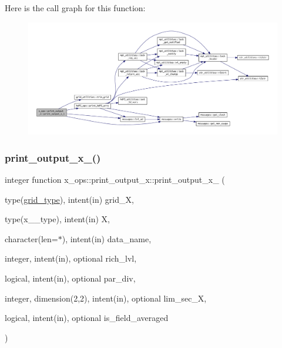 Here is the call graph for this function\+:\nopagebreak
\begin{figure}[H]
\begin{center}
\leavevmode
\includegraphics[width=350pt]{interfacex__ops_1_1print__output__x_af66cca1a3bd819c6eefe69974af7166d_cgraph}
\end{center}
\end{figure}
\mbox{\label{interfacex__ops_1_1print__output__x_a0600bd1f9ed6ec2ba0c748d52a932bc6}} 
\subsubsection{\texorpdfstring{print\+\_\+output\+\_\+x\+\_()}{print\_output\_x\_2()}}
{\footnotesize\ttfamily integer function x\+\_\+ops\+::print\+\_\+output\+\_\+x\+::print\+\_\+output\+\_\+x\+\_ (\begin{DoxyParamCaption}\item[{type(\hyperlink{structgrid__vars_1_1grid__type}{grid\+\_\+type}), intent(in)}]{grid\+\_\+X,  }\item[{type(x\+\_\+2\+\_\+type), intent(in)}]{X,  }\item[{character(len=$\ast$), intent(in)}]{data\+\_\+name,  }\item[{integer, intent(in), optional}]{rich\+\_\+lvl,  }\item[{logical, intent(in), optional}]{par\+\_\+div,  }\item[{integer, dimension(2,2), intent(in), optional}]{lim\+\_\+sec\+\_\+X,  }\item[{logical, intent(in), optional}]{is\+\_\+field\+\_\+averaged }\end{DoxyParamCaption})}



